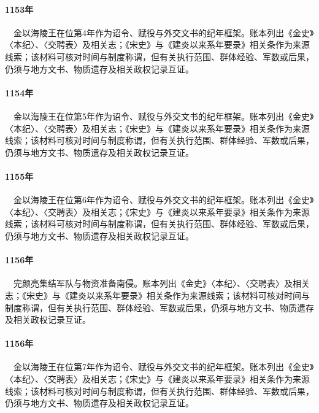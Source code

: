 \paragraph{1153年}　金以海陵王在位第4年作为诏令、赋役与外交文书的纪年框架。账本列出《金史》〈本纪〉、〈交聘表〉及相关志；《宋史》与《建炎以来系年要录》相关条作为来源线索；该材料可核对时间与制度称谓，但有关执行范围、群体经验、军数或后果，仍须与地方文书、物质遗存及相关政权记录互证。

\paragraph{1154年}　金以海陵王在位第5年作为诏令、赋役与外交文书的纪年框架。账本列出《金史》〈本纪〉、〈交聘表〉及相关志；《宋史》与《建炎以来系年要录》相关条作为来源线索；该材料可核对时间与制度称谓，但有关执行范围、群体经验、军数或后果，仍须与地方文书、物质遗存及相关政权记录互证。

\paragraph{1155年}　金以海陵王在位第6年作为诏令、赋役与外交文书的纪年框架。账本列出《金史》〈本纪〉、〈交聘表〉及相关志；《宋史》与《建炎以来系年要录》相关条作为来源线索；该材料可核对时间与制度称谓，但有关执行范围、群体经验、军数或后果，仍须与地方文书、物质遗存及相关政权记录互证。

\paragraph{1156年}　完颜亮集结军队与物资准备南侵。账本列出《金史》〈本纪〉、〈交聘表〉及相关志；《宋史》与《建炎以来系年要录》相关条作为来源线索；该材料可核对时间与制度称谓，但有关执行范围、群体经验、军数或后果，仍须与地方文书、物质遗存及相关政权记录互证。

\paragraph{1156年}　金以海陵王在位第7年作为诏令、赋役与外交文书的纪年框架。账本列出《金史》〈本纪〉、〈交聘表〉及相关志；《宋史》与《建炎以来系年要录》相关条作为来源线索；该材料可核对时间与制度称谓，但有关执行范围、群体经验、军数或后果，仍须与地方文书、物质遗存及相关政权记录互证。

